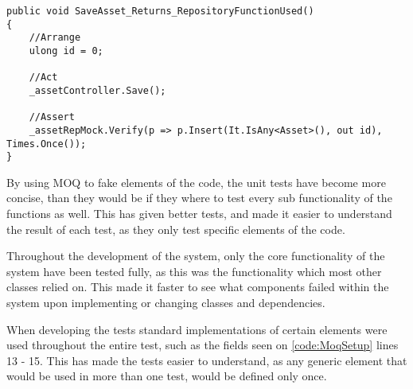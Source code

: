 \begin{listing}[H]
\begin{verbatim}
public void SaveAsset_Returns_RepositoryFunctionUsed()
{
    //Arrange
    ulong id = 0;
    
    //Act
    _assetController.Save();

    //Assert
    _assetRepMock.Verify(p => p.Insert(It.IsAny<Asset>(), out id), Times.Once());
}
\end{verbatim}
\label{code:MOQUsed}
\end{listing}

By using MOQ to fake elements of the code, the unit tests have become more concise, than they would be if they where to test every sub functionality of the functions as well. This has given better tests, and made it easier to understand the result of each test, as they only test specific elements of the code.
\par
Throughout the development of the system, only the core functionality of the system have been tested fully, as this was the functionality which most other classes relied on. This made it faster to see what components failed within the system upon implementing or changing classes and dependencies. 
\par
When developing the tests standard implementations of certain elements were used throughout the entire test, such as the fields seen on \autoref{code:MoqSetup} lines 13 - 15. This has made the tests easier to understand, as any generic element that would be used in more than one test, would be defined only once. 